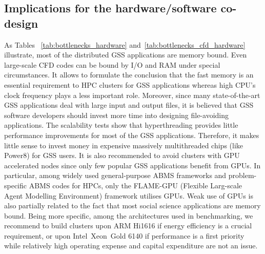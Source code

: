 \subsection{Implications for the hardware/software co-design}

As Tables ~\ref{tab:bottlenecks_hardware} and~\ref{tab:bottlenecks_cfd_hardware} illustrate, most of the distributed GSS applications are memory bound. Even large-scale CFD codes can be bound by I/O and RAM under special circumstances. It allows to formulate the conclusion that the fast memory is an essential requirement to HPC clusters for GSS applications whereas high CPU's clock frequency plays a less important role. Moreover, since many state-of-the-art GSS applications deal with large input and output files, it is believed that GSS software developers should invest more time into designing file-avoiding applications. The scalability tests show that hyperthreading provides little performance improvements for most of the GSS applications. Therefore, it makes little sense to invest money in expensive massively multithreaded chips (like Power8) for GSS users. It is also recommended to avoid clusters with GPU accelerated nodes since only few popular GSS applications benefit from GPUs. In particular, among widely used general-purpose ABMS frameworks and problem-specific ABMS codes for HPCs, only the FLAME-GPU (Flexible Larg-scale Agent Modelling Environment) \cite{2011:flame_gpu,2018:flame_gpu} framework utilises GPUs. Weak use of GPUs is also partially related to the fact that most social science applications are memory bound. Being more specific, among the architectures used in benchmarking, we recommend to build clusters upon ARM Hi1616 if energy efficiency is a crucial requirement, or upon Intel\textregistered\ Xeon\textregistered\ Gold 6140 if performance is a first priority while relatively high operating expense and capital expenditure are not an issue.


